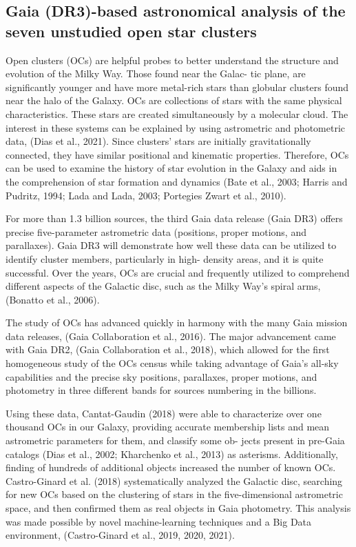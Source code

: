 \documentclass[../Main.tex]{subfiles}
\begin{document}
{\subsection{Gaia (DR3)-based astronomical analysis of the seven unstudied open star
clusters} 

Open clusters (OCs) are helpful probes to better understand the
structure and evolution of the Milky Way. Those found near the Galac-
tic plane, are significantly younger and have more metal-rich stars than
globular clusters found near the halo of the Galaxy. OCs are collections
of stars with the same physical characteristics. These stars are created
simultaneously by a molecular cloud. The interest in these systems can
be explained by using astrometric and photometric data, (Dias et al.,
2021). Since clusters’ stars are initially gravitationally connected, they
have similar positional and kinematic properties. Therefore, OCs can be
used to examine the history of star evolution in the Galaxy and aids in
the comprehension of star formation and dynamics (Bate et al., 2003;
Harris and Pudritz, 1994; Lada and Lada, 2003; Portegies Zwart et al.,
2010).

For more than 1.3 billion sources, the third Gaia data release (Gaia
DR3) offers precise five-parameter astrometric data (positions, proper
motions, and parallaxes). Gaia DR3 will demonstrate how well these
data can be utilized to identify cluster members, particularly in high-
density areas, and it is quite successful. Over the years, OCs are crucial
and frequently utilized to comprehend different aspects of the Galactic
disc, such as the Milky Way’s spiral arms, (Bonatto et al., 2006).

The study of OCs has advanced quickly in harmony with the many
Gaia mission data releases, (Gaia Collaboration et al., 2016). The major
advancement came with Gaia DR2, (Gaia Collaboration et al., 2018),
which allowed for the first homogeneous study of the OCs census
while taking advantage of Gaia’s all-sky capabilities and the precise sky
positions, parallaxes, proper motions, and photometry in three different
bands for sources numbering in the billions. 

Using these data, Cantat-Gaudin (2018) were able to characterize
over one thousand OCs in our Galaxy, providing accurate membership
lists and mean astrometric parameters for them, and classify some ob-
jects present in pre-Gaia catalogs (Dias et al., 2002; Kharchenko et al.,
2013) as asterisms. Additionally, finding of hundreds of additional
objects increased the number of known OCs. Castro-Ginard et al. (2018)
systematically analyzed the Galactic disc, searching for new OCs based
on the clustering of stars in the five-dimensional astrometric space, and
then confirmed them as real objects in Gaia photometry. This analysis
was made possible by novel machine-learning techniques and a Big
Data environment, (Castro-Ginard et al., 2019, 2020, 2021).

}
\end{document}
